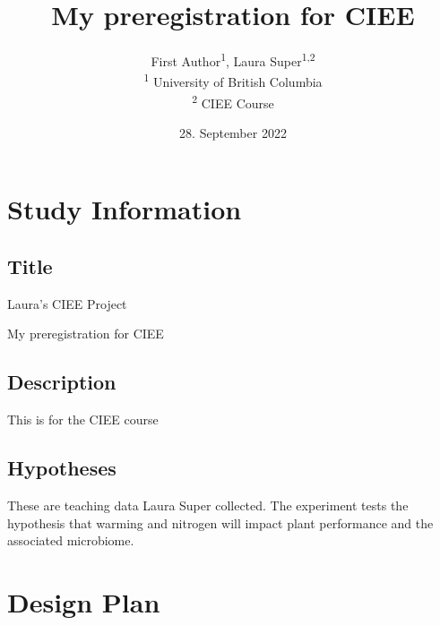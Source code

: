 \documentclass[]{article}
\title{My preregistration for CIEE}
\author{
          First Author\textsuperscript{1},
          Laura Super\textsuperscript{1,2}          \\ \vspace{0.5cm}
              \textsuperscript{1} University of British Columbia\\
              \textsuperscript{2} CIEE Course      }
\date{28. September 2022}
\newcounter{question}
\begin{document}
\maketitle
\vspace{2pc}


\ifPDFTeX
  \newcommand\Question[2]{%
   \leavevmode\par
   \stepcounter{question}
   \noindent
   \textbf{\thequestion. #1}. #2\par}
\else %
  \NewCommandCopy{\oldQuestion}{\Question}
  \renewcommand\Question[2]{%
   \leavevmode\par
   \stepcounter{question}
   \noindent
   \textbf{\thequestion. #1}. #2\par}
\fi



\newcommand\Answer[1]{%
    \noindent
    \textit{Registered response}: #1\par}

\hypertarget{study-information}{%
\section{Study Information}\label{study-information}}

\hypertarget{title}{%
\subsection{Title}\label{title}}

Laura's CIEE Project

My preregistration for CIEE

\hypertarget{description}{%
\subsection{Description}\label{description}}

This is for the CIEE course

\hypertarget{hypotheses}{%
\subsection{Hypotheses}\label{hypotheses}}

These are teaching data Laura Super collected. The experiment tests the
hypothesis that warming and nitrogen will impact plant performance and
the associated microbiome.

\hypertarget{design-plan}{%
\section{Design Plan}\label{design-plan}}
\end{document}
